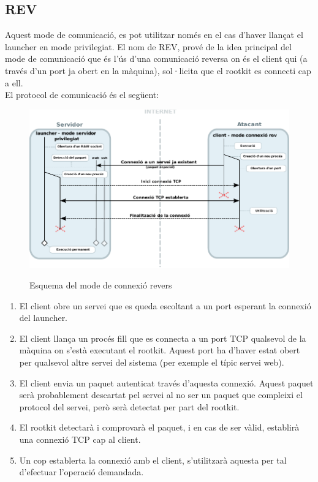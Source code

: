 \subsection{REV}

Aquest mode de comunicació, es pot utilitzar només en el cas d'haver llançat el launcher en mode privilegiat.
El nom de REV, prové de la idea principal del mode de comunicació que és l'ús d'una comunicació reversa on 
és el client qui (a través d'un port ja obert en la màquina), sol·licita que el rootkit es connecti cap a ell. \\

El protocol de comunicació és el següent: \\

\begin{figure}[htp]
    \centering
    \includegraphics[scale=1,keepaspectratio]{diagrames/solutionDesignPrivilegedServerModeREV.pdf} \\
    \caption{Esquema del mode de connexió revers}
    \label{fig:modePrivilegedServerREV}
\end{figure}

\begin{enumerate}
    \item El client obre un servei que es queda escoltant a un port esperant la connexió del launcher.
    \item El client llança un procés fill que es connecta a un port TCP qualsevol de la màquina on s'està 
        executant el rootkit. Aquest port ha d'haver estat obert per qualsevol altre servei del sistema (per 
        exemple el típic servei web).
    \item El client envia un paquet autenticat través d'aquesta connexió. Aquest paquet serà probablement  
        descartat pel servei al no ser un paquet que compleixi el protocol del servei, però serà detectat per
        part del rootkit.
    \item El rootkit detectarà i comprovarà el paquet, i en cas de ser vàlid, establirà una connexió TCP cap 
        al client.
    \item Un cop establerta la connexió amb el client, s'utilitzarà aquesta per tal d'efectuar l'operació 
        demandada.
\end{enumerate}

